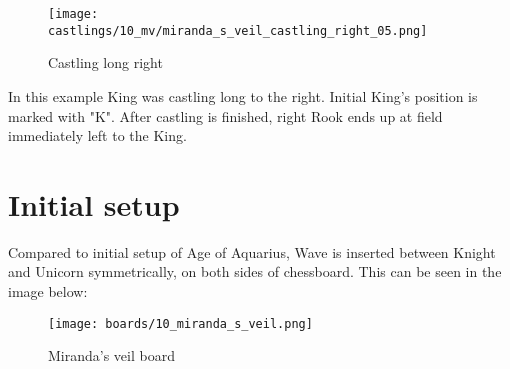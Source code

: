 \noindent
\begin{figure}[!h]
\texttt{[image: castlings/10\_mv/miranda\_s\_veil\_castling\_right\_05.png]}
\caption{Castling long right}
\label{fig:miranda_s_veil_castling_right_05}
\end{figure}

In this example King was castling long to the right. Initial King's position is marked with "K".
After castling is finished, right Rook ends up at field immediately left to the King.

\clearpage %

\section*{Initial setup}

Compared to initial setup of Age of Aquarius, Wave is inserted between Knight and Unicorn
symmetrically, on both sides of chessboard. This can be seen in the image below:

\noindent
\begin{figure}[h]
\texttt{[image: boards/10\_miranda\_s\_veil.png]}
\caption{Miranda's veil board}
\label{fig:10_miranda_s_veil}
\end{figure}

\clearpage %
